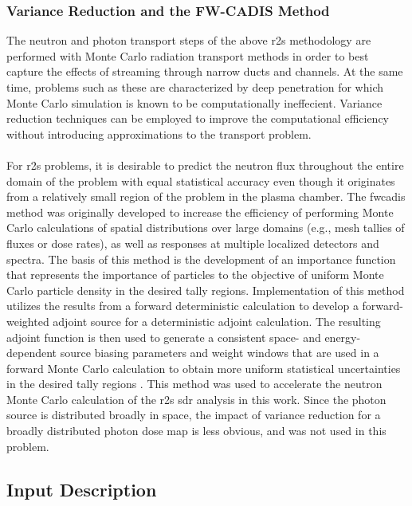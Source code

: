 \documentclass[12pt]{article}
\begin{document}
\subsubsection{Variance Reduction and the FW-CADIS Method}
The neutron and photon transport steps of the above \gls{r2s} methodology are
performed with Monte Carlo radiation transport methods in order to best
capture the effects of streaming through narrow ducts and channels.  At the
same time, problems such as these are characterized by deep penetration for
which Monte Carlo simulation is known to be computationally ineffecient.
Variance reduction techniques can be employed to improve the computational
efficiency without introducing approximations to the transport problem.
\\
\\
For \gls{r2s} problems, it is desirable to predict the neutron flux throughout
the entire domain of the problem with equal statistical accuracy even though
it originates from a relatively small region of the problem in the plasma
chamber.  The \gls{fwcadis} method was originally developed to increase the
efficiency of performing Monte Carlo calculations of spatial distributions
over large domains (e.g., mesh tallies of fluxes or dose rates), as well as
responses at multiple localized detectors and spectra. The basis of this
method is the development of an importance function that represents the
importance of particles to the objective of uniform Monte Carlo particle
density in the desired tally regions.  Implementation of this method utilizes
the results from a forward deterministic calculation to develop a
forward-weighted adjoint source for a deterministic adjoint calculation. The
resulting adjoint function is then used to generate a consistent space- and
energy-dependent source biasing parameters and weight windows that are used in
a forward Monte Carlo calculation to obtain more uniform statistical
uncertainties in the desired tally regions \cite{wagnerNSEFWCADIS}. This
method was used to accelerate the neutron Monte Carlo calculation of
the \gls{r2s} \gls{sdr} analysis in this work.  Since the photon source is
distributed broadly in space, the impact of variance reduction for a broadly
distributed photon dose map is less obvious, and was not used in this problem.

\subsection{Input Description}
\end{document}
